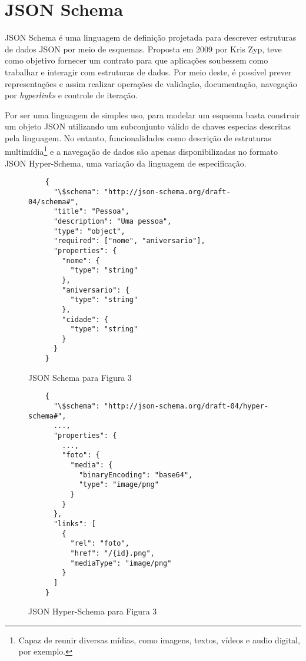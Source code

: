 \section[JSON Schema]{JSON Schema}

JSON Schema é uma linguagem de definição projetada para descrever estruturas de dados JSON por meio de esquemas. Proposta em 2009 por Kris Zyp, teve como objetivo fornecer um contrato para que aplicações soubessem como trabalhar e interagir com estruturas de dados. Por meio deste, é possível prever representações e assim realizar operações de validação, documentação, navegação por \textit{hyperlinks} e controle de iteração. \cite{Zyp2013}

Por ser uma linguagem de simples uso, para modelar um esquema basta construir um objeto JSON utilizando um subconjunto válido de chaves especias descritas pela linguagem. No entanto, funcionalidades como descrição de estruturas multimídia\footnote{
 Capaz de reunir diversas mídias, como imagens, textos, vídeos e audio digital, por exemplo.
} e a navegação de dados são apenas disponibilizadas no formato JSON Hyper-Schema, uma variação da linguagem de especificação. \cite{Jackson2016}

\begin{figure}[H]
  \centering
  \begin{verbatim}
    {
      "\$schema": "http://json-schema.org/draft-04/schema#",
      "title": "Pessoa",
      "description": "Uma pessoa",
      "type": "object",
      "required": ["nome", "aniversario"],
      "properties": {
        "nome": {
          "type": "string"
        },
        "aniversario": {
          "type": "string"
        },
        "cidade": {
          "type": "string"
        }
      }
    }
  \end{verbatim}
  \caption{JSON Schema para Figura 3}
\end{figure}

\begin{figure}[H]
  \centering
  \begin{verbatim}
    {
      "\$schema": "http://json-schema.org/draft-04/hyper-schema#",
      ...,
      "properties": {
        ...,
        "foto": {
          "media": {
            "binaryEncoding": "base64",
            "type": "image/png"
          }
        }
      },
      "links": [
        {
          "rel": "foto",
          "href": "/{id}.png",
          "mediaType": "image/png"
        }
      ]
    }
  \end{verbatim}
  \caption{JSON Hyper-Schema para Figura 3}
\end{figure}

